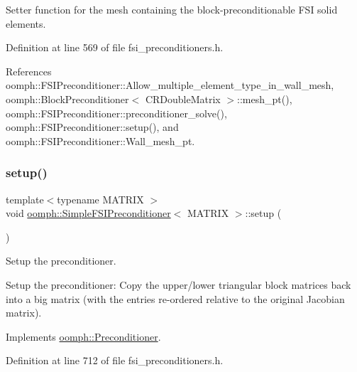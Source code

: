 Setter function for the mesh containing the block-\/preconditionable F\+SI solid elements. 



Definition at line 569 of file fsi\+\_\+preconditioners.\+h.



References oomph\+::\+F\+S\+I\+Preconditioner\+::\+Allow\+\_\+multiple\+\_\+element\+\_\+type\+\_\+in\+\_\+wall\+\_\+mesh, oomph\+::\+Block\+Preconditioner$<$ C\+R\+Double\+Matrix $>$\+::mesh\+\_\+pt(), oomph\+::\+F\+S\+I\+Preconditioner\+::preconditioner\+\_\+solve(), oomph\+::\+F\+S\+I\+Preconditioner\+::setup(), and oomph\+::\+F\+S\+I\+Preconditioner\+::\+Wall\+\_\+mesh\+\_\+pt.

\mbox{\label{classoomph_1_1SimpleFSIPreconditioner_aaf19c0c3f19f6d8ef4f36a1581829230}} 
\subsubsection{\texorpdfstring{setup()}{setup()}}
{\footnotesize\ttfamily template$<$typename M\+A\+T\+R\+IX $>$ \\
void \hyperlink{classoomph_1_1SimpleFSIPreconditioner}{oomph\+::\+Simple\+F\+S\+I\+Preconditioner}$<$ M\+A\+T\+R\+IX $>$\+::setup (\begin{DoxyParamCaption}{ }\end{DoxyParamCaption})\hspace{0.3cm}{\ttfamily [virtual]}}



Setup the preconditioner. 

Setup the preconditioner\+: Copy the upper/lower triangular block matrices back into a big matrix (with the entries re-\/ordered relative to the original Jacobian matrix). 

Implements \hyperlink{classoomph_1_1Preconditioner_af4886f4efe510e5c9b0eb19422943588}{oomph\+::\+Preconditioner}.



Definition at line 712 of file fsi\+\_\+preconditioners.\+h.



